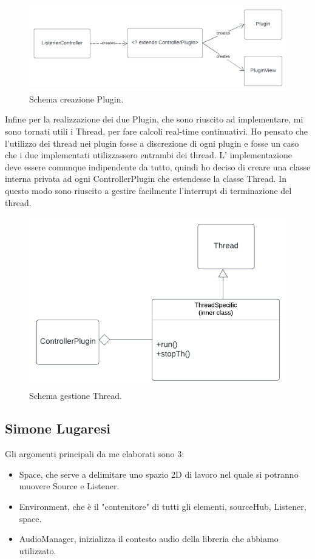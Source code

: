 \documentclass[a4paper,12pt]{report}
\begin{document}
\begin{figure}[H]
\centering{}
\includegraphics[width=\textwidth]{img/listener/PluginCreates.png}
\caption{Schema creazione Plugin.}
\label{img:Listener}
\end{figure}
%
Infine per la realizzazione dei due Plugin, che sono riuscito ad implementare, mi sono tornati utili i Thread, per fare calcoli real-time continuativi. Ho pensato che l'utilizzo dei thread nei plugin fosse a discrezione di ogni plugin e fosse un caso che i due implementati utilizzassero entrambi dei thread. L' implementazione deve essere comunque indipendente da tutto, quindi ho deciso di creare una classe interna privata ad ogni ControllerPlugin che estendesse la classe Thread. In questo modo sono riuscito a gestire facilmente l'interrupt di terminazione del thread.
\begin{figure}[H]
\centering{}
\includegraphics[width=\textwidth]{img/listener/PluginThread.png}
\caption{Schema gestione Thread.}
\label{img:Listener}
\end{figure}

\subsection{Simone Lugaresi}
Gli argomenti principali da me elaborati sono 3:
\begin{itemize}
	\item Space, che serve a delimitare uno spazio 2D di lavoro nel quale si potranno muovere Source e Listener.
	\item Environment, che è il "contenitore" di tutti gli elementi, sourceHub, Listener, space.
	\item AudioManager, inizializza il contesto audio della libreria che abbiamo utilizzato.
\end{itemize}
\end{document}
